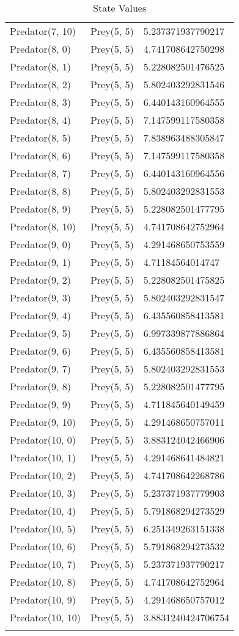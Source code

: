 \begin{longtable}{| p{} | p{} | p{} |}
Predator(7, 10) & Prey(5, 5) &5.237371937790217\\
Predator(8, 0) & Prey(5, 5) &4.741708642750298\\
Predator(8, 1) & Prey(5, 5) &5.228082501476525\\
Predator(8, 2) & Prey(5, 5) &5.802403292831546\\
Predator(8, 3) & Prey(5, 5) &6.440143160964555\\
Predator(8, 4) & Prey(5, 5) &7.147599117580358\\
Predator(8, 5) & Prey(5, 5) &7.838963488305847\\
Predator(8, 6) & Prey(5, 5) &7.147599117580358\\
Predator(8, 7) & Prey(5, 5) &6.440143160964556\\
Predator(8, 8) & Prey(5, 5) &5.802403292831553\\
Predator(8, 9) & Prey(5, 5) &5.228082501477795\\
Predator(8, 10) & Prey(5, 5) &4.741708642752964\\
Predator(9, 0) & Prey(5, 5) &4.291468650753559\\
Predator(9, 1) & Prey(5, 5) &4.71184564014747\\
Predator(9, 2) & Prey(5, 5) &5.228082501475825\\
Predator(9, 3) & Prey(5, 5) &5.802403292831547\\
Predator(9, 4) & Prey(5, 5) &6.435560858413581\\
Predator(9, 5) & Prey(5, 5) &6.997339877886864\\
Predator(9, 6) & Prey(5, 5) &6.435560858413581\\
Predator(9, 7) & Prey(5, 5) &5.802403292831553\\
Predator(9, 8) & Prey(5, 5) &5.228082501477795\\
Predator(9, 9) & Prey(5, 5) &4.711845640149459\\
Predator(9, 10) & Prey(5, 5) &4.291468650757011\\
Predator(10, 0) & Prey(5, 5) &3.883124042466906\\
Predator(10, 1) & Prey(5, 5) &4.291468641484821\\
Predator(10, 2) & Prey(5, 5) &4.741708642268786\\
Predator(10, 3) & Prey(5, 5) &5.237371937779903\\
Predator(10, 4) & Prey(5, 5) &5.791868294273529\\
Predator(10, 5) & Prey(5, 5) &6.251349263151338\\
Predator(10, 6) & Prey(5, 5) &5.791868294273532\\
Predator(10, 7) & Prey(5, 5) &5.237371937790217\\
Predator(10, 8) & Prey(5, 5) &4.741708642752964\\
Predator(10, 9) & Prey(5, 5) &4.291468650757012\\
Predator(10, 10) & Prey(5, 5) &3.8831240424706754\\
\caption{State Values} 
\label{tab:myfirstlongtable}
\end{longtable}




